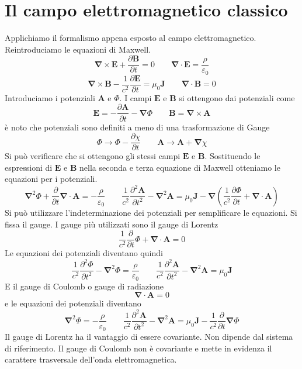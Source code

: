 \section{Il campo elettromagnetico classico}
Applichiamo il formalismo appena esposto al campo elettromagnetico. Reintroduciamo le equazioni di Maxwell.
$$
\boldsymbol{\nabla} \times \mathbf{E} + \frac{\partial \mathbf{B}}{\partial t} = 0 \qquad \boldsymbol{\nabla} \cdot \mathbf{E} = \frac{\rho}{\varepsilon_0}
$$
$$
\boldsymbol{\nabla} \times \mathbf{B} - \frac{1}{c^2} \frac{\partial \mathbf{E}}{\partial t} = \mu_0 \mathbf{J} \qquad \boldsymbol{\nabla} \cdot \mathbf{B} = 0
$$
Introduciamo i potenziali $\mathbf{A}$ e $\Phi$. I campi $\mathbf{E}$ e $\mathbf{B}$ si ottengono dai potenziali come
$$
\mathbf{E} = -\frac{\partial \mathbf{A}}{\partial t} - \boldsymbol{\nabla} \Phi \qquad \mathbf{B} = \boldsymbol{\nabla} \times \mathbf{A}
$$
è noto che potenziali sono definiti a meno di una trasformazione di Gauge
$$
\Phi \to \Phi - \frac{\partial \chi}{\partial t} \qquad \mathbf{A} \to \mathbf{A} + \boldsymbol{\nabla} \chi
$$
Si può verificare che si ottengono gli stessi campi $\mathbf{E}$ e $\mathbf{B}$. Sostituendo le espressioni di $\mathbf{E}$ e $\mathbf{B}$ nella seconda e terza equazione di Maxwell otteniamo le equazioni per i potenziali. 
$$
\boldsymbol{\nabla}^2 \Phi + \frac{\partial}{\partial t} \boldsymbol{\nabla} \cdot \mathbf{A} = -\frac{\rho}{\varepsilon_0} \qquad \frac{1}{c^2} \frac{\partial^2 \mathbf{A}}{\partial t^2} - \boldsymbol{\nabla}^2 \mathbf{A} = \mu_0 \mathbf{J} - \boldsymbol{\nabla} \left( \frac{1}{c^2} \frac{\partial \Phi}{\partial t} + \boldsymbol{\nabla} \cdot \mathbf{A} \right)
$$
Si può utilizzare l'indeterminazione dei potenziali per semplificare le equazioni. Si fissa il gauge. I gauge più utilizzati sono il gauge di Lorentz 
$$
\frac{1}{c^2} \frac{\partial}{\partial t} \Phi + \boldsymbol{\nabla} \cdot \mathbf{A} = 0
$$
Le equazioni dei potenziali diventano quindi
$$
\frac{1}{c^2} \frac{\partial^2 \Phi}{\partial t^2} - \boldsymbol{\nabla}^2 \Phi = \frac{\rho}{\varepsilon_0} \qquad \frac{1}{c^2} \frac{\partial^2 \mathbf{A}}{\partial t^2} - \boldsymbol{\nabla}^2 \mathbf{A} = \mu_0 \mathbf{J}
$$
E il gauge di Coulomb o gauge di radiazione
$$
\boldsymbol{\nabla} \cdot \mathbf{A} = 0
$$
e le equazioni dei potenziali diventano
$$
\boldsymbol{\nabla}^2 \Phi = -\frac{\rho}{\varepsilon_0} \qquad \frac{1}{c^2} \frac{\partial^2 \mathbf{A}}{\partial t^2} - \boldsymbol{\nabla}^2 \mathbf{A} = \mu_0 \mathbf{J} - \frac{1}{c^2} \frac{\partial}{\partial t} \boldsymbol{\nabla} \Phi
$$
Il gauge di Lorentz ha il vantaggio di essere covariante. Non dipende dal sistema di riferimento. Il gauge di Coulomb non è covariante e mette in evidenza il carattere trasversale dell'onda elettromagnetica.

